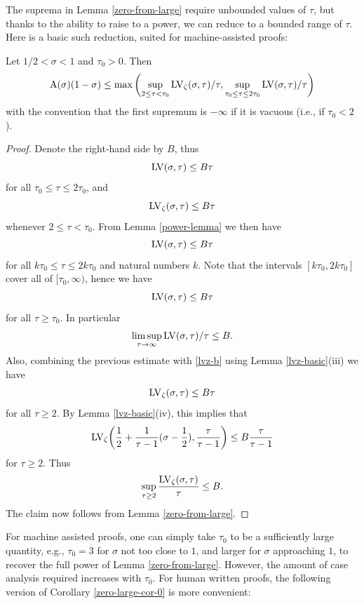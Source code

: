 The suprema in Lemma \ref{zero-from-large} require unbounded values of $\tau$, but thanks to the ability to raise to a power, we can reduce to a bounded range of $\tau$.  Here is a basic such reduction, suited for machine-assisted proofs:

\begin{corollary}\label{zero-large-cor-0} Let $1/2 < \sigma < 1$ and $\tau_0 > 0$.  Then
    $$ \mathrm{A}(\sigma)(1-\sigma) \leq \max \left(\sup_{2 \leq \tau < \tau_0} \mathrm{LV}_\zeta(\sigma,\tau)/\tau, \sup_{\tau_0 \leq \tau \leq 2\tau_0} \mathrm{LV}(\sigma,\tau)/\tau\right)$$
    with the convention that the first supremum is $-\infty$ if it is vacuous (i.e., if $\tau_0 < 2$).
\end{corollary}

\begin{proof}
Denote the right-hand side by $B$, thus
    $$ \mathrm{LV}(\sigma,\tau) \leq B\tau$$
    for all $\tau_0 \leq \tau \leq 2\tau_0$, and
    \begin{equation}\label{lvz-b}
         \mathrm{LV}_\zeta(\sigma,\tau) \leq B\tau
    \end{equation}
    whenever $2 \leq \tau < \tau_0$.  From Lemma \ref{power-lemma} we then have
    $$ \mathrm{LV}(\sigma,\tau) \leq B\tau$$
    for all $k\tau_0 \leq \tau \leq 2k\tau_0$ and natural numbers $k$. Note that the intervals $[k\tau_0, 2k\tau_0]$ cover all of $[\tau_0,\infty)$, hence we have
    $$ \mathrm{LV}(\sigma,\tau) \leq B\tau$$
    for all $\tau \geq \tau_0$. In particular
    $$ \limsup_{\tau \to \infty} \mathrm{LV}(\sigma,\tau)/\tau  \leq B.$$
    Also, combining the previous estimate with \eqref{lvz-b} using Lemma \ref{lvz-basic}(iii) we have
    \begin{equation}\label{lvzo}
     \mathrm{LV}_\zeta(\sigma,\tau) \leq B\tau
    \end{equation}
    for all $\tau \geq 2$.  By Lemma \ref{lvz-basic}(iv), this implies that
    $$ \mathrm{LV}_\zeta\bigg(\frac{1}{2} + \frac{1}{\tau-1} (\sigma-\frac{1}{2}), \frac{\tau}{\tau-1} \bigg) \leq B \frac{\tau}{\tau-1}$$
    for $\tau \geq 2$.  Thus
    $$ \sup_{\tau \geq 2} \frac{\mathrm{LV}_\zeta(\sigma,\tau)}{\tau} \leq B.$$
    The claim now follows from Lemma \ref{zero-from-large}.
\end{proof}

For machine assisted proofs, one can simply take $\tau_0$ to be a sufficiently large quantity, e.g., $\tau_0=3$ for $\sigma$ not too close to $1$, and larger for $\sigma$ approaching $1$, to recover the full power of Lemma \ref{zero-from-large}.  However, the amount of case analysis required increases with $\tau_0$.  For human written proofs, the following version of Corollary \ref{zero-large-cor-0} is more convenient:

